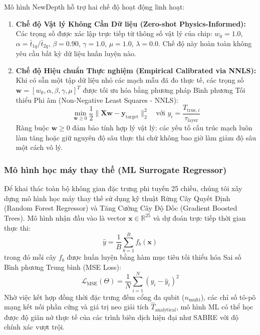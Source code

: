 \documentclass[11pt, a4paper]{article}
\begin{document}
Mô hình NewDepth hỗ trợ hai chế độ hoạt động linh hoạt:
\begin{enumerate}
    \item \textbf{Chế độ Vật lý Không Cần Dữ liệu (Zero-shot Physics-Informed):} Các trọng số được xác lập trực tiếp từ thông số vật lý của chip: $w_0 = 1.0$, $\alpha = \bar{t}_{1q} / \bar{t}_{2q}$, $\beta = 0.90$, $\gamma = 1.0$, $\mu = 1.0$, $\lambda = 0.0$. Chế độ này hoàn toàn không yêu cầu bất kỳ dữ liệu huấn luyện nào.
    \item \textbf{Chế độ Hiệu chuẩn Thực nghiệm (Empirical Calibrated via NNLS):} Khi có sẵn một tập dữ liệu nhỏ các mạch mẫu đã đo thực tế, các trọng số $\mathbf{w} = [w_0, \alpha, \beta, \gamma, \mu]^T$ được tối ưu hóa bằng phương pháp Bình phương Tối thiểu Phi âm (Non-Negative Least Squares - NNLS):
    \begin{equation}
        \min_{\mathbf{w} \ge 0} \frac{1}{2} \|\mathbf{X} \mathbf{w} - \mathbf{y}_{\text{target}}\|_2^2 \quad \text{với } y_i = \frac{T_{\text{true}, i}}{\tau_{\text{layer}}}
    \end{equation}
    Ràng buộc $\mathbf{w} \ge 0$ đảm bảo tính hợp lý vật lý: các yếu tố cấu trúc mạch luôn làm tăng hoặc giữ nguyên độ sâu thực thi chứ không bao giờ làm giảm độ sâu một cách vô lý.
\end{enumerate}

\subsubsection{Mô hình học máy thay thế (ML Surrogate Regressor)}
Để khai thác toàn bộ không gian đặc trưng phi tuyến 25 chiều, chúng tôi xây dựng mô hình học máy thay thế sử dụng kỹ thuật Rừng Cây Quyết Định (Random Forest Regressor) và Tăng Cường Cây Độ Dốc (Gradient Boosted Trees). Mô hình nhận đầu vào là vector $\mathbf{x} \in \mathbb{R}^{25}$ và dự đoán trực tiếp thời gian thực thi:
\begin{equation}
    \hat{y} = \frac{1}{B} \sum_{b=1}^{B} f_b(\mathbf{x})
\end{equation}
trong đó mỗi cây $f_b$ được huấn luyện bằng hàm mục tiêu tối thiểu hóa Sai số Bình phương Trung bình (MSE Loss):
\begin{equation}
    \mathcal{L}_{\text{MSE}}(\Theta) = \frac{1}{N} \sum_{i=1}^{N} \left( y_i - \hat{y}_i \right)^2
\end{equation}
Nhờ việc kết hợp đồng thời đặc trưng đếm cổng đa qubit ($n_{\text{multi}}$), các chỉ số tô-pô mạng kết nối phần cứng và giá trị neo giải tích $\hat{T}_{\text{analytical}}$, mô hình ML có thể học được độ giãn nở thực tế của các trình biên dịch hiện đại như SABRE \cite{li2019tackling} với độ chính xác vượt trội.
\end{document}
